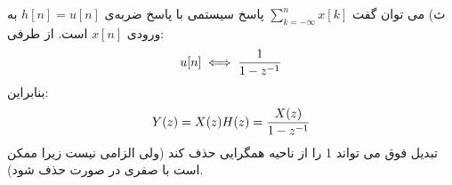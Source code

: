 \documentclass[10pt,letterpaper]{article}
\begin{document}
ث) می توان گفت 
$
\sum_{k=-\infty}^nx[k]
$
 پاسخ سیستمی با پاسخ ضربه‌ی 
$
h[n]=u[n]
$
 به ورودی 
$
x[n]
$
 است. از طرفی:
$$
u[n]\iff {1\over 1-z^{-1}}
$$
بنابراین:
$$
Y(z)=X(z)H(z)={X(z)\over 1-z^{-1}}
$$
تبدیل فوق می تواند 1 را از ناحیه همگرایی حذف کند (ولی الزامی نیست زیرا ممکن است با صفری در صورت حذف شود).
\end{document}
